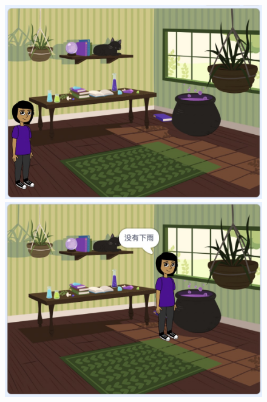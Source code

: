 \documentclass[10pt, a4paper]{article}
\begin{document}
\begin{enumerate}
\begin{figure}[htb]
\begin{minipage}[t]{.2\textwidth}
                \includegraphics[width=\textwidth]{37-3.jpg}
            \end{minipage}
            \begin{minipage}[t]{.2\textwidth}
                \centering
                \includegraphics[width=\textwidth]{37-4.jpg}
            \end{minipage}
        \end{figure}
    \end{enumerate}
\end{document}
